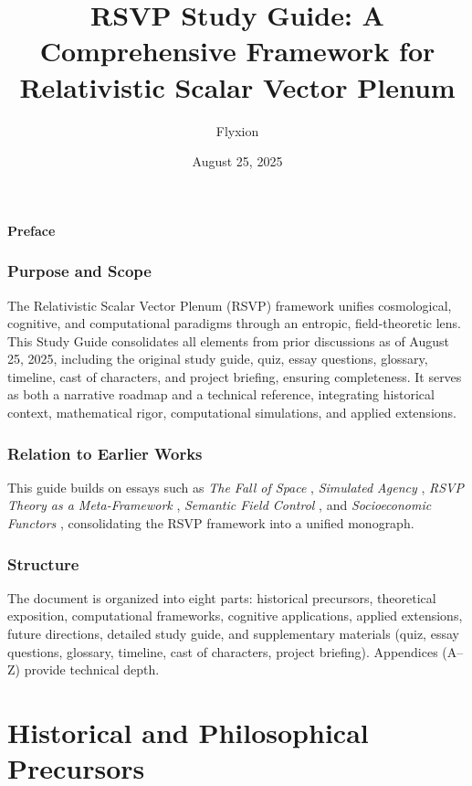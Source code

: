 \documentclass[12pt]{report}
\title{RSVP Study Guide: A Comprehensive Framework for Relativistic Scalar Vector Plenum}
\author{Flyxion}
\date{August 25, 2025}
\begin{document}
\maketitle
\tableofcontents

\begin{center}
    \textbf{Preface}
\end{center}

\section*{Purpose and Scope}
The Relativistic Scalar Vector Plenum (RSVP) framework unifies cosmological, cognitive, and computational paradigms through an entropic, field-theoretic lens. This Study Guide consolidates all elements from prior discussions as of August 25, 2025, including the original study guide, quiz, essay questions, glossary, timeline, cast of characters, and project briefing, ensuring completeness. It serves as both a narrative roadmap and a technical reference, integrating historical context, mathematical rigor, computational simulations, and applied extensions.

\section*{Relation to Earlier Works}
This guide builds on essays such as \textit{The Fall of Space} \citep{FallOfSpace2025}, \textit{Simulated Agency} \citep{SimulatedAgency2025}, \textit{RSVP Theory as a Meta-Framework} \citep{RSVPMeta2025}, \textit{Semantic Field Control} \citep{SemanticField2025}, and \textit{Socioeconomic Functors} \citep{SocioeconomicFunctors2025}, consolidating the RSVP framework into a unified monograph.

\section*{Structure}
The document is organized into eight parts: historical precursors, theoretical exposition, computational frameworks, cognitive applications, applied extensions, future directions, detailed study guide, and supplementary materials (quiz, essay questions, glossary, timeline, cast of characters, project briefing). Appendices (A--Z) provide technical depth.

\part{Historical and Philosophical Precursors}
\end{document}
